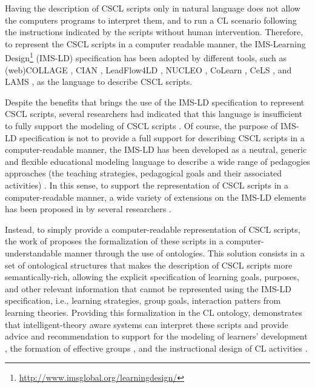 Having the description of CSCL scripts only in natural language does not allow the computers programs to interpret them, and to run a CL scenario following the instructions indicated by the scripts without human intervention. Therefore, to represent the CSCL scripts in a computer readable manner, the IMS-Learning Design\footnote{\url{http://www.imsglobal.org/learningdesign/}} (IMS-LD) specification has been adopted by different tools, such as (web)COLLAGE \cite{Hernandez-LeoVillasclaras-FernandezAsensio-PerezDimitriadisJorrin-AbellanRuiz-RequiesRubia-Avi2006,Villasclaras-FernandezHernandez-LeoAsensio-PerezDimitriadis2013}, CIAN \cite{MolinaRedondoOrtega2012}, LeadFlow4LD \cite{Palomino-RamirezBote-LorenzoAsensio-PerezDimitriadis2008}, NUCLEO \cite{SanchoFuentes-FernandezFernandez-Manjon2008}, CoLearn \cite{StylianakisArapiMoumoutzisChristodoulakis2013}, CeLS \cite{RonenKohen-Vacs2009}, and LAMS \cite{Romero-MorenoOrtegaTroyano2007}, as the language to describe CSCL scripts.
 
Despite the benefits that brings  the use of the IMS-LD specification to represent CSCL scripts, several researchers had indicated that this language is insufficient to fully support the modeling of CSCL scripts \cite{AlharbiAthaudaChiong2014, CaeiroAnidoLlamas2003}. Of course, the purpose of IMS-LD specification is not to provide a full support for describing CSCL scripts in a computer-readable manner, the IMS-LD has been developed as a neutral, generic and flexible educational modeling language to describe a wide range of pedagogies approaches (the teaching strategies, pedagogical goals and their associated activities) \cite{Koper2005}. In this sense, to support the representation of CSCL scripts in a computer-readable manner, a wide variety of extensions on the IMS-LD elements has been proposed in by several researchers \cite{Bote-LorenzoVaquero-GonzalezVega-GorgojoDimitriadisAsensio-PerezGomez-SanchezHernandez-Leo2004, LeoPerezDimitriadis2004, MagnisalisDemetriadis2012, MiaoHoeksemaHoppeHarrer2005, Vega-GorgojoBote-LorenzoGomez-SanchezDimitriadisAsensio-Perez2005}.

Instead, to simply provide a computer-readable representation of CSCL scripts, the work of  proposes the formalization of these scripts in a computer-understandable manner through the use of ontologies. This solution consists in a set of ontological structures that makes the description of CSCL scripts more semantically-rich, allowing the explicit specification of learning goals, purposes, and other relevant information that cannot be represented using the IMS-LD specification, i.e., learning strategies, group goals, interaction patters from learning theories. Providing this formalization in the CL ontology,  demonstrates that intelligent-theory aware systems can interpret these scripts and provide advice and recommendation to support for the modeling of learners' development \cite{InabaIkedaMizoguchi2003}, the formation of effective groups \cite{IsotaniMizoguchi2008a}, and the instructional design of CL activities \cite{IsotaniMizoguchiIsotaniCapeliIsotanideAlbuquerqueBittencourtJaques2013}.

